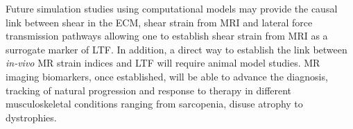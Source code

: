 Future simulation studies using computational models may provide the causal link between shear in the ECM, shear strain from MRI and lateral force transmission pathways allowing one to establish shear strain from MRI as a surrogate marker of LTF. 
In addition, a direct way to establish the link between \textit{in-vivo} MR strain indices and LTF will require animal model studies. 
MR imaging biomarkers, once established, will be able to advance the diagnosis, tracking of natural progression and response to therapy in different musculoskeletal conditions ranging from sarcopenia, disuse atrophy to dystrophies.